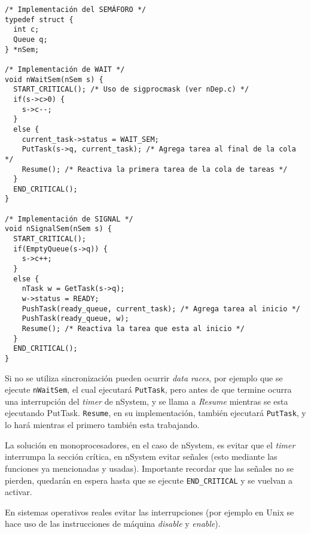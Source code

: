 \begin{verbatim}
/* Implementación del SEMÁFORO */
typedef struct {
  int c;
  Queue q;
} *nSem;

/* Implementación de WAIT */
void nWaitSem(nSem s) {
  START_CRITICAL(); /* Uso de sigprocmask (ver nDep.c) */
  if(s->c>0) {
    s->c--;
  }
  else {
    current_task->status = WAIT_SEM;
    PutTask(s->q, current_task); /* Agrega tarea al final de la cola */
    Resume(); /* Reactiva la primera tarea de la cola de tareas */
  }
  END_CRITICAL();
}

/* Implementación de SIGNAL */
void nSignalSem(nSem s) {
  START_CRITICAL();
  if(EmptyQueue(s->q)) {
    s->c++;
  }
  else {
    nTask w = GetTask(s->q);
    w->status = READY;
    PushTask(ready_queue, current_task); /* Agrega tarea al inicio */
    PushTask(ready_queue, w);
    Resume(); /* Reactiva la tarea que esta al inicio */
  }
  END_CRITICAL();
}
\end{verbatim}

Si no se utiliza sincronización pueden ocurrir \textit{data races}, por ejemplo que se ejecute \texttt{nWaitSem}, el cual ejecutará \texttt{PutTask}, pero antes de que termine ocurra una interrupción del \textit{timer} de nSystem, y se llama a \textit{Resume} mientras se esta ejecutando PutTask. \texttt{Resume}, en su implementación, también ejecutará \texttt{PutTask}, y lo hará mientras el primero también esta trabajando.

La solución en monoprocesadores, en el caso de nSystem, es evitar que el \textit{timer} interrumpa la sección crítica, en nSystem evitar señales (esto mediante las funciones ya mencionadas y usadas). Importante recordar que las señales no se pierden, quedarán en espera hasta que se ejecute \texttt{END\_CRITICAL} y se vuelvan a activar.

En sistemas operativos reales evitar las interrupciones (por ejemplo en Unix se hace uso de las instrucciones de máquina \textit{disable} y \textit{enable}). 



